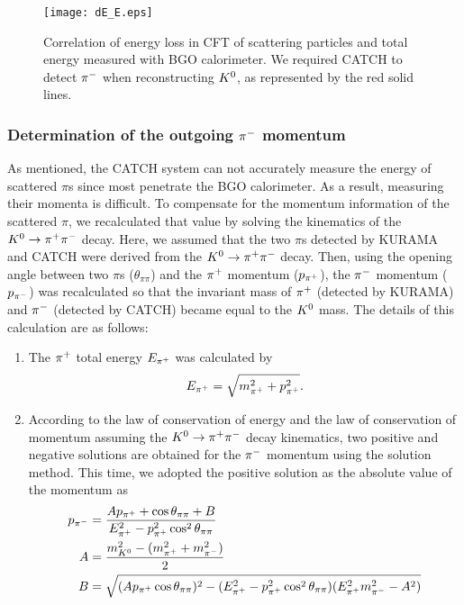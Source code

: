 \begin{figure}[!h]
  \begin{center}
    \texttt{[image: dE\_E.eps]}
    \caption{Correlation of energy loss in CFT of scattering particles and total energy measured with BGO calorimeter. We required CATCH to detect $\pi^{-}$ when reconstructing $K^{0}$, as represented by the red solid lines.}
    \label{fig-dE_E}
  \end{center}
\end{figure}

\subsubsection{Determination of the outgoing $\pi^{-}$ momentum}
As mentioned, the CATCH system can not accurately measure the energy of scattered $\pi$s since most penetrate the BGO calorimeter. As a result, measuring their momenta is difficult. To compensate for the momentum information of the scattered $\pi$, we recalculated that value by solving the kinematics of the $K^0 \to \pi^+ \pi^-$ decay. Here, we assumed that the two $\pi$s detected by KURAMA and CATCH were derived from the $K^0 \to \pi^+ \pi^-$ decay. Then, using the opening angle between two $\pi$s ($\theta_{\pi\pi}$) and the $\pi^{+}$ momentum ($p_{\pi^{+}}$), the $\pi^{-}$ momentum ($p_{\pi^{-}}$) was recalculated so that the invariant mass of $\pi^{+}$ (detected by KURAMA) and $\pi^{-}$ (detected by CATCH) became equal to the $K^{0}$ mass. The details of this calculation are as follows:

\begin{enumerate}
  \item The $\pi^{+}$ total energy $E_{\pi^{+}}$ was calculated by 
\begin{equation}
  E_{\pi^{+}} = \sqrt{m_{\pi^{+}}^{2} + p_{\pi^{+}}^{2}}.
\end{equation}

  \item According to the law of conservation of energy and the law of conservation of momentum assuming the $K^0 \to \pi^+ \pi^-$ decay kinematics, two positive and negative solutions are obtained for the $\pi^{-}$ momentum using the solution method. This time, we adopted the positive solution as the absolute value of the momentum as 
\begin{align}
  p_{\pi^{-}} &= \frac{Ap_{\pi^{+}} + \cos{\theta_{\pi\pi}} + B}{E_{\pi^{+}}^{2} - p_{\pi^{+}}^{2} \cos^{2}{\theta_{\pi\pi}}} \\
  A &= \frac{m_{K^{0}}^{2} - (m_{\pi^{+}}^{2} + m_{\pi^{-}}^{2})}{2} \\
  B &= \sqrt{(Ap_{\pi^{+}}\cos{\theta_{\pi\pi}})^{2} - (E_{\pi^{+}}^{2} - p_{\pi^{+}}^{2} \cos^{2}{\theta_{\pi\pi}}) (E_{\pi^{+}}^{2}m_{\pi^{-}}^{2} - A^{2})}
\end{align}

\end{enumerate}

